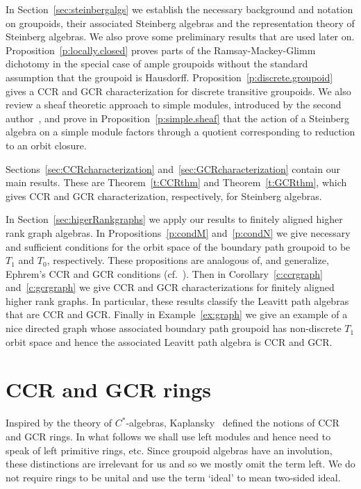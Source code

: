 \documentclass[11pt,reqno]{amsart}
\theoremstyle{plain}
\numberwithin{equation}{section}
\begin{document}
In Section~\ref{sec:steinbergalgs} we establish the necessary background and notation on groupoids, their associated Steinberg algebras and the representation theory of Steinberg algebras. We also prove some preliminary results that are used later on. Proposition~\ref{p:locally.closed}  proves parts of the Ramsay-Mackey-Glimm dichotomy in the special case of ample groupoids without the standard assumption that the groupoid is Hausdorff. Proposition~\ref{p:discrete.groupoid} gives a CCR and GCR characterization for discrete transitive groupoids. We also review a sheaf theoretic approach to simple modules, introduced by the second author~\cite{St14}, and prove in Proposition~\ref{p:simple.sheaf} that the action of a Steinberg algebra on a simple module factors through a quotient corresponding to reduction to an orbit closure.


Sections~\ref{sec:CCRcharacterization} and~\ref{sec:GCRcharacterization} contain our main results. These are Theorem~\ref{t:CCRthm} and Theorem~\ref{t:GCRthm}, which gives CCR and GCR characterization, respectively,  for Steinberg algebras.

In Section~\ref{sec:higerRankgraphs} we apply our results to finitely aligned higher rank graph algebras. In Propositions~\ref{p:condM} and~\ref{p:condN} we give necessary and sufficient conditions for the orbit space of the boundary path groupoid to be $T_1$ and $T_0$, respectively. These propositions are analogous of, and generalize, Ephrem's CCR and GCR conditions (cf.~\cite{Eph04}). Then in  Corollary~\ref{c:ccrgraph} and~\ref{c:gcrgraph} we give CCR and GCR characterizations for finitely aligned higher rank graphs.  In particular, these results classify the Leavitt path algebras~\cite{LeavittBook} that are CCR and GCR.
Finally in Example~\ref{ex:graph} we give an example of a nice directed graph whose associated boundary path groupoid has non-discrete $T_1$ orbit space and hence the associated Leavitt path algebra is CCR and GCR.


\section{CCR and GCR rings} \label{sec:Rings}
Inspired by the theory of $C^*$-algebras, Kaplansky~\cite{K89} defined the notions of CCR and GCR rings.  In what follows we shall use left modules and hence need to speak of left primitive rings, etc.  Since groupoid algebras have an involution, these distinctions are irrelevant for us and so we mostly omit the term left.  We do not require rings to be unital and use the term `ideal' to mean two-sided ideal.
\end{document}
